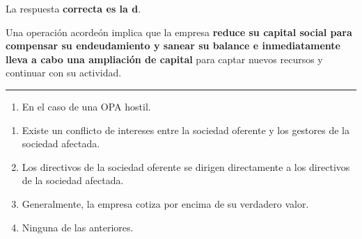 \documentclass[
  letterpaper,
  DIV=11,
  numbers=noendperiod]{scrreprt}
\providecommand{\tightlist}{%
  \setlength{\itemsep}{0pt}\setlength{\parskip}{0pt}}\usepackage{longtable,booktabs,array}
\begin{document}
\begin{tcolorbox}[enhanced jigsaw, left=2mm, opacityback=0, colback=white, breakable, arc=.35mm, bottomrule=.15mm, rightrule=.15mm, toprule=.15mm, leftrule=.75mm, colframe=quarto-callout-tip-color-frame]
\begin{minipage}[t]{5.5mm}
\textcolor{quarto-callout-tip-color}{\faLightbulb}
\end{minipage}%
\begin{minipage}[t]{\textwidth - 5.5mm}

La respuesta \textbf{correcta es la d}.

Una operación acordeón implica que la empresa \textbf{reduce su capital
social para compensar su endeudamiento y sanear su balance e
inmediatamente lleva a cabo una ampliación de capital} para captar
nuevos recursos y continuar con su actividad.

\end{minipage}%
\end{tcolorbox}

\begin{center}\rule{0.5\linewidth}{0.5pt}\end{center}

\begin{enumerate}
\def\labelenumi{\arabic{enumi}.}
\setcounter{enumi}{40}
\tightlist
\item
  En el caso de una OPA hostil.
\end{enumerate}

\begin{enumerate}
\def\labelenumi{\alph{enumi})}
\item
  Existe un conflicto de intereses entre la sociedad oferente y los
  gestores de la sociedad afectada.
\item
  Los directivos de la sociedad oferente se dirigen directamente a los
  directivos de la sociedad afectada.
\item
  Generalmente, la empresa cotiza por encima de su verdadero valor.
\item
  Ninguna de las anteriores.
\end{enumerate}
\end{document}

